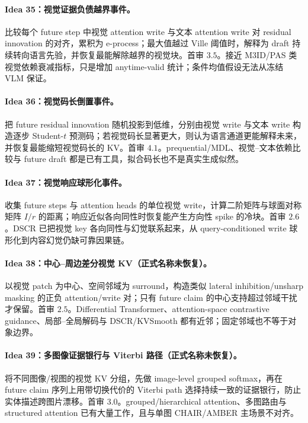 \documentclass[UTF8,zihao=-4,a4paper]{ctexart}
\begin{document}
\paragraph{Idea 35：视觉证据负债越界事件。}
比较每个 future step 中视觉 attention write 与文本 attention write 对 residual innovation 的对齐，累积为 e-process；最大值越过 Ville 阈值时，解释为 draft 持续转向语言先验，并恢复最能解除越界的视觉块。首审 $3.5$。接近 M3ID/PAS 类视觉依赖衰减指标，只是增加 anytime-valid 统计；条件均值假设无法从冻结 VLM 保证。

\paragraph{Idea 36：视觉码长倒置事件。}
把 future residual innovation 随机投影到低维，分别由视觉 write 与文本 write 构造逐步 Student-$t$ 预测码；若视觉码长显著更大，则认为语言通道更能解释未来，并恢复最能缩短视觉码长的 KV。首审 $4.1$。prequential/MDL、视觉--文本依赖比较与 future draft 都是已有工具，拟合码长也不是真实生成似然。

\paragraph{Idea 37：视觉响应球形化事件。}
收集 future steps 与 attention heads 的单位视觉 write，计算二阶矩阵与球面对称矩阵 $I/r$ 的距离；响应近似各向同性时恢复能产生方向性 spike 的冷块。首审 $2.6$。DSCR 已把视觉 key 各向同性与幻觉联系起来，从 query-conditioned write 球形化到内容幻觉仍缺可靠因果链。

\paragraph{Idea 38：中心--周边差分视觉 KV（正式名称未恢复）。}
以视觉 patch 为中心、空间邻域为 surround，构造类似 lateral inhibition/unsharp masking 的正负 attention/write 对；只有 future claim 的中心支持超过邻域干扰才保留。首审 $2.5$。Differential Transformer、attention-space contrastive guidance、局部--全局解码与 DSCR/KVSmooth 都有近邻；固定邻域也不等于对象边界。

\paragraph{Idea 39：多图像证据银行与 Viterbi 路径（正式名称未恢复）。}
将不同图像/视图的视觉 KV 分组，先做 image-level grouped softmax，再在 future claim 序列上用带切换代价的 Viterbi path 选择持续一致的证据银行，防止实体描述跨图片漂移。首审 $3.0$。grouped/hierarchical attention、多图路由与 structured attention 已有大量工作，且与单图 CHAIR/AMBER 主场景不对齐。
\end{document}
